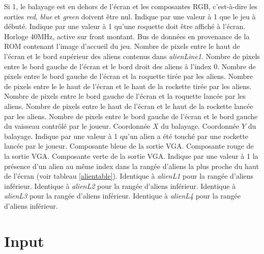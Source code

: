 \documentclass[french]{nakrule}
\begin{document}
\begin{descr}
   Si 1, le balayage est en dehors de l'écran et les
  composantes RGB, c'est-à-dire les sorties \emph{red}, \emph{blue} et
  \emph{green} doivent être nul.
   Indique par une valeur à 1 que le jeu à débuté.
   Indique par une valeur à 1 qu'une roquette doit être
  affiché à l'écran.
   Horloge 40MHz, active sur front montant.
   Bus de données en provenance de la ROM contenant
  l'image d'accueil du jeu.
   Nombre de pixels entre le haut de l'écran et le bord
  supérieur des aliens contenus dans \emph{alienLine1}.
   Nombre de pixels entre le bord gauche de l'écran et le
  bord droit des aliens à l'index 0.
   Nombre de pixels entre le bord gauche de l'écran et
  la roquette tirée par les aliens.
   Nombre de pixels entre le le haut de l'écran et le
  haut de la rockette tirée par les aliens.
   Nombre de pixels entre le bord gauche de l'écran et la roquette
  lancée par les aliens.
   Nombre de pixels entre le haut de l'écran et le haut de la rockette
  lancée par les aliens.
   Nombre de pixels entre le bord gauche de l'écran et
  le bord gauche du vaisseau contrôlé par le joueur.
   Coordonnée $X$ du balayage.
   Coordonnée $Y$ du balayage.
   Indique par une valeur à 1 qu'un alien a été touché
  par une rockette lancée par le joueur.
   Composante bleue de la sortie VGA.
   Composante rouge de la sortie VGA.
   Composante verte de la sortie VGA.
   Indique par une valeur à 1 la présence d'un alien au même
  index dans la rangée d'aliens la plus proche du haut de l'écran (voir tableau
  \ref{alientable}).
   Identique à \emph{alienL1} pour la rangée d'aliens inférieur.
   Identique à \emph{alienL2} pour la rangée d'aliens inférieur.
   Identique à \emph{alienL3} pour la rangée d'aliens inférieur.
   Identique à \emph{alienL4} pour la rangée d'aliens inférieur.
\end{descr}

\clearpage

\section{Input}
\label{sec:input}
\end{document}
